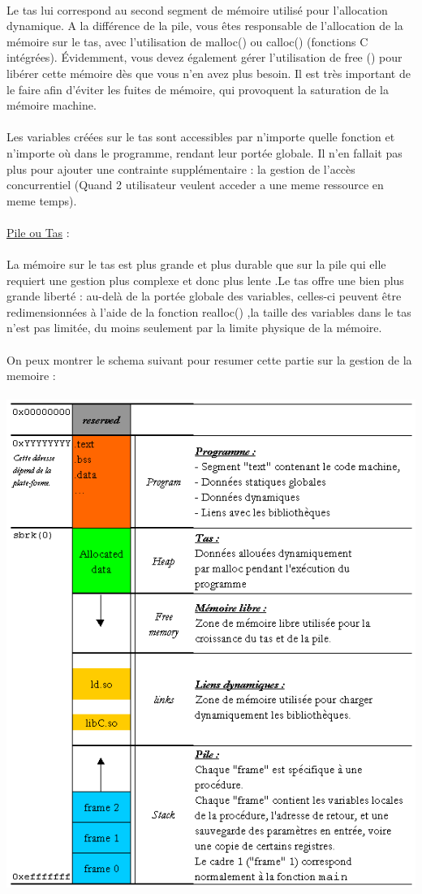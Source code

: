 \documentclass[a4paper,12pt,openany]{book}
\begin{document}
{\\
Le tas lui correspond au second segment de mémoire utilisé pour l’allocation dynamique. A la différence de la pile, vous êtes responsable de l’allocation de la mémoire sur le tas, avec l’utilisation de malloc() ou calloc() (fonctions C intégrées). Évidemment, vous devez également gérer l’utilisation de free () pour libérer cette mémoire dès que vous n’en avez plus besoin. Il est très important de le faire afin d’éviter les fuites de mémoire, qui provoquent la saturation de la mémoire machine.\\
\\
Les variables créées sur le tas sont accessibles par n’importe quelle fonction et n’importe où dans le programme, rendant leur portée globale. Il n’en fallait pas plus pour ajouter une contrainte supplémentaire : la gestion de l’accès concurrentiel (Quand 2 utilisateur veulent acceder a une meme ressource en meme temps).\\
\\
\underline{Pile ou Tas} : \\
\\
La mémoire sur le tas est plus grande et plus durable que sur la pile qui elle requiert une gestion plus complexe et donc plus lente .Le tas offre une bien plus grande liberté : au-delà de la portée globale des variables, celles-ci peuvent être redimensionnées à l’aide de la fonction realloc() ,la taille des variables dans le tas n’est pas limitée, du moins seulement par la limite physique de la mémoire.\\
\\
On peux montrer le schema suivant pour resumer cette partie sur la gestion de la memoire :\\
\\
\includegraphics[width=0.5\linewidth,center]{img/gestion_memoire.png}\\
\\








}
\end{document}
